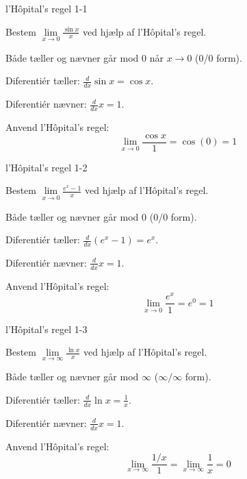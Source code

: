 \documentclass{article}
\begin{document}

\tableofcontents
\newpage

\begin{exercise}{l'Hôpital's regel 1-1}

Bestem $\lim\limits_{x \to 0} \frac{\sin x}{x}$ ved hjælp af l'Hôpital's regel.


\hint

Både tæller og nævner går mod 0 når $x \to 0$ (0/0 form).

\hint

Diferentiér tæller: $\frac{d}{dx} \sin x = \cos x$.

\hint

Diferentiér nævner: $\frac{d}{dx} x = 1$.

\hint

Anvend l'Hôpital's regel:
\[
\lim\limits_{x \to 0} \frac{\cos x}{1} = \cos(0) = 1
\]

\end{exercise}

\newpage

\begin{exercise}{l'Hôpital's regel 1-2}

Bestem $\lim\limits_{x \to 0} \frac{e^x - 1}{x}$ ved hjælp af l'Hôpital's regel.


\hint

Både tæller og nævner går mod 0 (0/0 form).

\hint

Diferentiér tæller: $\frac{d}{dx} (e^x - 1) = e^x$.

\hint

Diferentiér nævner: $\frac{d}{dx} x = 1$.

\hint

Anvend l'Hôpital's regel:
\[
\lim\limits_{x \to 0} \frac{e^x}{1} = e^0 = 1
\]

\end{exercise}

\newpage

\begin{exercise}{l'Hôpital's regel 1-3}

Bestem $\lim\limits_{x \to \infty} \frac{\ln x}{x}$ ved hjælp af l'Hôpital's regel.


\hint

Både tæller og nævner går mod $\infty$ ($\infty/\infty$ form).

\hint

Diferentiér tæller: $\frac{d}{dx} \ln x = \frac{1}{x}$.

\hint

Diferentiér nævner: $\frac{d}{dx} x = 1$.

\hint

Anvend l'Hôpital's regel:
\[
\lim\limits_{x \to \infty} \frac{1/x}{1} = \lim\limits_{x \to \infty} \frac{1}{x} = 0
\]

\end{exercise}
\end{document}
